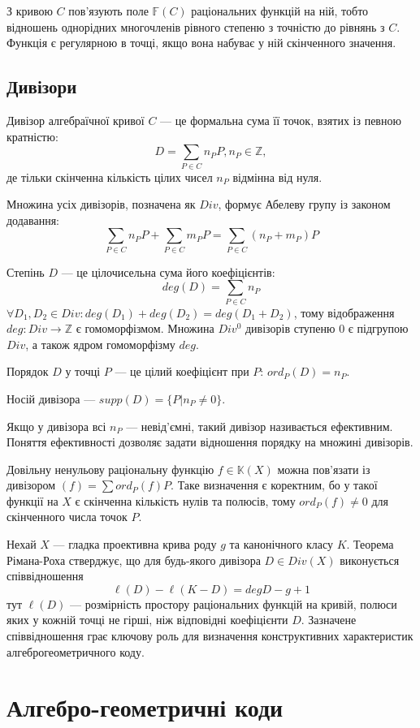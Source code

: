 \documentclass[a4paper,12pt,oneside]{article}
\begin{document}
З кривою $C$ пов'язують поле $\mathbb{F}(C)$ раціональних функцій на ній, тобто відношень однорідних многочленів 
рівного степеню з точністю до рівнянь з $C$. Функція є регулярною в точці, якщо вона набуває у ній скінченного значення.



\subsection{Дивізори}
Дивізор алгебраїчної кривої $C$ --- це формальна сума її точок, взятих із певною кратністю:
$$D = \sum_{P \in C} n_P P, n_P \in \mathbb{Z},$$
де тільки скінченна кількість цілих чисел $n_P$ відмінна від нуля.

Множина усіх дивізорів, позначена як $Div$, формує Абелеву групу із законом додавання:
$$
\sum_{P \in C} n_P P + \sum_{P \in C} m_P P = \sum_{P \in C} (n_P + m_P) P
$$

Степінь $D$ --- це цілочисельна сума його коефіцієнтів:
$$deg(D) = \sum_{P \in C} n_P$$
$\forall D_1, D_2 \in Div: deg(D_1) + deg(D_2) = deg(D_1 + D_2)$, тому відображення $deg: Div \to \mathbb{Z}$ є гомоморфізмом.
Множина $Div^0$ дивізорів ступеню 0 є підгрупою $Div$, а також ядром гомоморфізму $deg$.

Порядок $D$ у точці $P$ --- це цілий коефіцієнт при $P$: $ord_P(D) = n_P$.

Носій дивізора --- $supp(D) = \{ P | n_P \neq 0 \}$.

Якщо у дивізора всі $n_P$ --- невід'ємні, такий дивізор називається ефективним. Поняття ефективності дозволяє задати відношення порядку на множині дивізорів. 

Довільну ненульову раціональну функцію $f \in \mathbb{K}(X)$ можна пов'язати із дивізором $(f) = \sum ord_P(f)P$. 
Таке визначення є коректним, бо у такої функції на $X$ є скінченна кількість нулів та полюсів, тому $ord_P(f) \neq 0$ для скінченного числа точок $P$.

Нехай $X$ --- гладка проективна крива роду $g$ та канонічного класу $K$. Теорема Рімана-Роха стверджує, 
що для будь-якого дивізора $D \in Div(X)$ виконується співвідношення
$$\ell(D) - \ell(K-D) = deg D - g +1$$
тут $\ell(D)$ --- розмірність простору раціональних функцій на кривій, полюси яких у кожній точці не гірші, 
ніж відповідні коефіцієнти $D$. Зазначене співвідношення грає ключову роль для визначення конструктивних 
характеристик алгеброгеометричного коду.

\section{Алгебро-геометричні коди}
\end{document}

